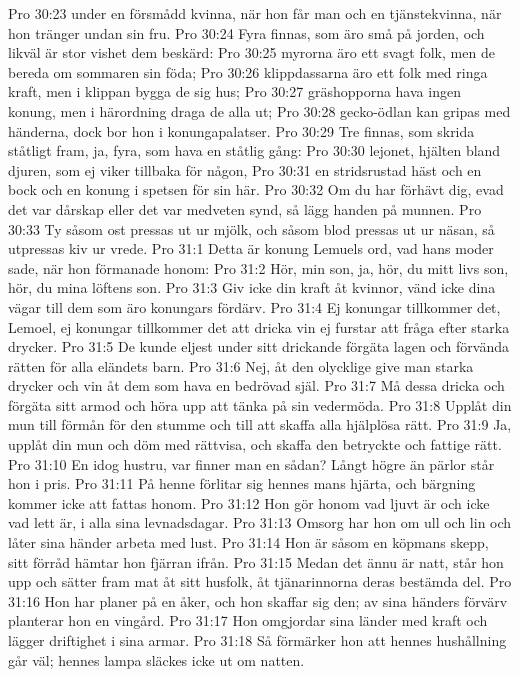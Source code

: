 Pro 30:23  under en försmådd kvinna, när hon får man och en tjänstekvinna, när hon tränger undan sin fru.
Pro 30:24  Fyra finnas, som äro små på jorden, och likväl är stor vishet dem beskärd:
Pro 30:25  myrorna äro ett svagt folk, men de bereda om sommaren sin föda;
Pro 30:26  klippdassarna äro ett folk med ringa kraft, men i klippan bygga de sig hus;
Pro 30:27  gräshopporna hava ingen konung, men i härordning draga de alla ut;
Pro 30:28  gecko-ödlan kan gripas med händerna, dock bor hon i konungapalatser.
Pro 30:29  Tre finnas, som skrida ståtligt fram, ja, fyra, som hava en ståtlig gång:
Pro 30:30  lejonet, hjälten bland djuren, som ej viker tillbaka för någon,
Pro 30:31  en stridsrustad häst och en bock och en konung i spetsen för sin här.
Pro 30:32  Om du har förhävt dig, evad det var dårskap eller det var medveten synd, så lägg handen på munnen.
Pro 30:33  Ty såsom ost pressas ut ur mjölk, och såsom blod pressas ut ur näsan, så utpressas kiv ur vrede.
Pro 31:1  Detta är konung Lemuels ord, vad hans moder sade, när hon förmanade honom:
Pro 31:2  Hör, min son, ja, hör, du mitt livs son, hör, du mina löftens son.
Pro 31:3  Giv icke din kraft åt kvinnor, vänd icke dina vägar till dem som äro konungars fördärv.
Pro 31:4  Ej konungar tillkommer det, Lemoel, ej konungar tillkommer det att dricka vin ej furstar att fråga efter starka drycker.
Pro 31:5  De kunde eljest under sitt drickande förgäta lagen och förvända rätten för alla eländets barn.
Pro 31:6  Nej, åt den olycklige give man starka drycker och vin åt dem som hava en bedrövad själ.
Pro 31:7  Må dessa dricka och förgäta sitt armod och höra upp att tänka på sin vedermöda.
Pro 31:8  Upplåt din mun till förmån för den stumme och till att skaffa alla hjälplösa rätt.
Pro 31:9  Ja, upplåt din mun och döm med rättvisa, och skaffa den betryckte och fattige rätt.
Pro 31:10  En idog hustru, var finner man en sådan? Långt högre än pärlor står hon i pris.
Pro 31:11  På henne förlitar sig hennes mans hjärta, och bärgning kommer icke att fattas honom.
Pro 31:12  Hon gör honom vad ljuvt är och icke vad lett är, i alla sina levnadsdagar.
Pro 31:13  Omsorg har hon om ull och lin och låter sina händer arbeta med lust.
Pro 31:14  Hon är såsom en köpmans skepp, sitt förråd hämtar hon fjärran ifrån.
Pro 31:15  Medan det ännu är natt, står hon upp och sätter fram mat åt sitt husfolk, åt tjänarinnorna deras bestämda del.
Pro 31:16  Hon har planer på en åker, och hon skaffar sig den; av sina händers förvärv planterar hon en vingård.
Pro 31:17  Hon omgjordar sina länder med kraft och lägger driftighet i sina armar.
Pro 31:18  Så förmärker hon att hennes hushållning går väl; hennes lampa släckes icke ut om natten.

